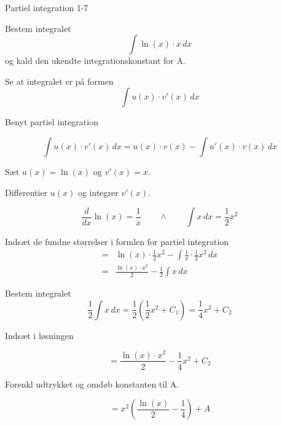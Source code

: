 \documentclass{article}
\begin{document}
\begin{exercise}{Partiel integration 1-7}
	
	
	Bestem integralet
	\[
	\int \ln(x) \cdot x \, dx
	\]
	og kald den ukendte integrationskonstant for A.
	
	
	
	\hint
	
	Se at integralet er på formen
	\[
	\int u(x) \cdot v'(x) \, dx
	\]
	
	\hint
	
	Benyt partiel integration
	
	\hint
	\[
	\int u(x) \cdot v'(x)\, dx = u(x) \cdot v(x) - \int u'(x) \cdot v(x) \, dx
	\]
	\hint
	
	Sæt $u(x) = \ln(x)$ og $v'(x) = x$.
	
	
	\hint
	
	Differentier $u(x)$ og integrer $v'(x)$.
	
	\hint
	\[
	\frac{d}{dx}\ln(x) = \frac{1}{x} \qquad \wedge \qquad \int x \, dx = \frac{1 }{2}x^2
	\]
	
	\hint
	
	Indsæt de fundne størrelser i formlen for partiel integration
	\begin{align*}
	=& \ln(x) \cdot \frac{1}{2}x^2 - \int \frac{1}{x} \cdot \frac{1}{2}x^2 \, dx \\
	=& \frac{\ln(x) \cdot x^2}{2} - \frac{1}{2}\int x \, dx 
	\end{align*}
	
	\hint
	
	Bestem integralet
	\[
	\frac{1}{2}\int x \, dx = \frac{1}{2} \left( \frac{1}{2}x^2 + C_1 \right) = \frac{1}{4}x^2 + C_2
	\]
	
	\hint
	Indsæt i løsningen 
	
	\hint
	
	\[
	= \frac{\ln(x) \cdot x^2}{2} - \frac{1}{4}x^2 + C_2
	\]
	
	\hint
	
	Forenkl udtrykket og omdøb konstanten til A.
	
	\hint
	
	\[
	= x^2 \left( \frac{\ln(x)}{2} - \frac{1}{4}   \right) + A
	\]
	
	
\end{exercise}

\newpage
\end{document}
